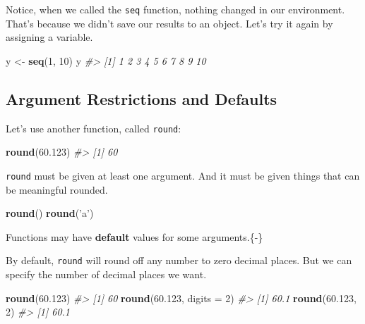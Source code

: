 \documentclass[]{book}
\newenvironment{Shaded}{\begin{snugshade}}{\end{snugshade}}
\newcommand{\KeywordTok}[1]{\textcolor[rgb]{0.13,0.29,0.53}{\textbf{#1}}}
\newcommand{\DataTypeTok}[1]{\textcolor[rgb]{0.13,0.29,0.53}{#1}}
\newcommand{\DecValTok}[1]{\textcolor[rgb]{0.00,0.00,0.81}{#1}}
\newcommand{\FloatTok}[1]{\textcolor[rgb]{0.00,0.00,0.81}{#1}}
\newcommand{\StringTok}[1]{\textcolor[rgb]{0.31,0.60,0.02}{#1}}
\newcommand{\CommentTok}[1]{\textcolor[rgb]{0.56,0.35,0.01}{\textit{#1}}}
\newcommand{\NormalTok}[1]{#1}
\begin{document}
Notice, when we called the \texttt{seq} function, nothing changed in our
environment. That's because we didn't save our results to an object.
Let's try it again by assigning a variable.

\begin{Shaded}
\begin{Highlighting}[]
\NormalTok{y <-}\StringTok{ }\KeywordTok{seq}\NormalTok{(}\DecValTok{1}\NormalTok{, }\DecValTok{10}\NormalTok{)}
\NormalTok{y}
\CommentTok{#>  [1]  1  2  3  4  5  6  7  8  9 10}
\end{Highlighting}
\end{Shaded}

\subsection{Argument Restrictions and
Defaults}\label{argument-restrictions-and-defaults}

Let's use another function, called \texttt{round}:

\begin{Shaded}
\begin{Highlighting}[]
\KeywordTok{round}\NormalTok{(}\FloatTok{60.123}\NormalTok{)}
\CommentTok{#> [1] 60}
\end{Highlighting}
\end{Shaded}

\texttt{round} must be given at least one argument. And it must be given
things that can be meaningful rounded.

\begin{Shaded}
\begin{Highlighting}[]
\KeywordTok{round}\NormalTok{()}
\KeywordTok{round}\NormalTok{(}\StringTok{'a'}\NormalTok{)}
\end{Highlighting}
\end{Shaded}

Functions may have \textbf{default} values for some arguments.\{-\}

By default, \texttt{round} will round off any number to zero decimal
places. But we can specify the number of decimal places we want.

\begin{Shaded}
\begin{Highlighting}[]
\KeywordTok{round}\NormalTok{(}\FloatTok{60.123}\NormalTok{)}
\CommentTok{#> [1] 60}
\KeywordTok{round}\NormalTok{(}\FloatTok{60.123}\NormalTok{, }\DataTypeTok{digits =} \DecValTok{2}\NormalTok{)}
\CommentTok{#> [1] 60.1}
\KeywordTok{round}\NormalTok{(}\FloatTok{60.123}\NormalTok{, }\DecValTok{2}\NormalTok{)}
\CommentTok{#> [1] 60.1}
\end{Highlighting}
\end{Shaded}
\end{document}
